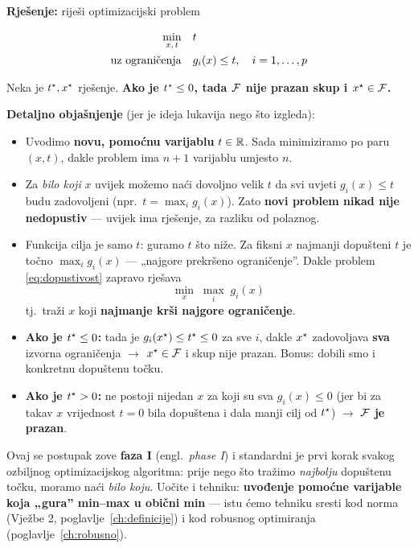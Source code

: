 \textbf{Rješenje:} riješi optimizacijski problem

\begin{equation}
\label{eq:dopustivost}
\begin{aligned}
\min_{x,\,t} \quad & t \\
\uzogr & g_i(x) \le t, \quad i = 1,\dots,p
\end{aligned}
\end{equation}

Neka je $t\opt, x\opt$ rješenje. \textbf{Ako je $t\opt \le 0$, tada $\Feas$ nije
prazan skup i $x\opt \in \Feas$.}

\textbf{Detaljno objašnjenje} (jer je ideja lukavija nego što izgleda):

\begin{itemize}
  \item Uvodimo \textbf{novu, pomoćnu varijablu} $t \in \R$. Sada minimiziramo
        po paru $(x, t)$, dakle problem ima $n + 1$ varijablu umjesto $n$.
  \item Za \emph{bilo koji} $x$ uvijek možemo naći dovoljno velik $t$ da svi
        uvjeti $g_i(x) \le t$ budu zadovoljeni (npr.\ $t = \max_i g_i(x)$). Zato
        \textbf{novi problem nikad nije nedopustiv} --- uvijek ima rješenje, za
        razliku od polaznog.
  \item Funkcija cilja je samo $t$: guramo $t$ što niže. Za fiksni $x$ najmanji
        dopušteni $t$ je točno $\max_i g_i(x)$ --- „najgore prekršeno
        ograničenje”. Dakle problem \eqref{eq:dopustivost} zapravo rješava
        \[
        \min_x \; \max_{i} \; g_i(x)
        \]
        tj.\ traži $x$ koji \textbf{najmanje krši najgore ograničenje}.
  \item \textbf{Ako je $t\opt \le 0$:} tada je $g_i(x\opt) \le t\opt \le 0$ za
        sve $i$, dakle $x\opt$ zadovoljava \textbf{sva} izvorna ograničenja
        $\to$ $x\opt \in \Feas$ i skup nije prazan. Bonus: dobili smo i
        konkretnu dopuštenu točku.
  \item \textbf{Ako je $t\opt > 0$:} ne postoji nijedan $x$ za koji su sva
        $g_i(x) \le 0$ (jer bi za takav $x$ vrijednost $t = 0$ bila dopuštena i
        dala manji cilj od $t\opt$) $\to$ $\Feas$ \textbf{je prazan}.
\end{itemize}

\begin{napomena}[faza I]
Ovaj se postupak zove \textbf{faza I} (engl.\ \emph{phase I}) i standardni je
prvi korak svakog ozbiljnog optimizacijskog algoritma: prije nego što tražimo
\emph{najbolju} dopuštenu točku, moramo naći \emph{bilo koju}. Uočite i
tehniku: \textbf{uvođenje pomoćne varijable koja „gura” min--max u obični min}
--- istu ćemo tehniku sresti kod norma (Vježbe 2, poglavlje~\ref{ch:definicije})
i kod robusnog optimiranja (poglavlje~\ref{ch:robusno}).
\end{napomena}

